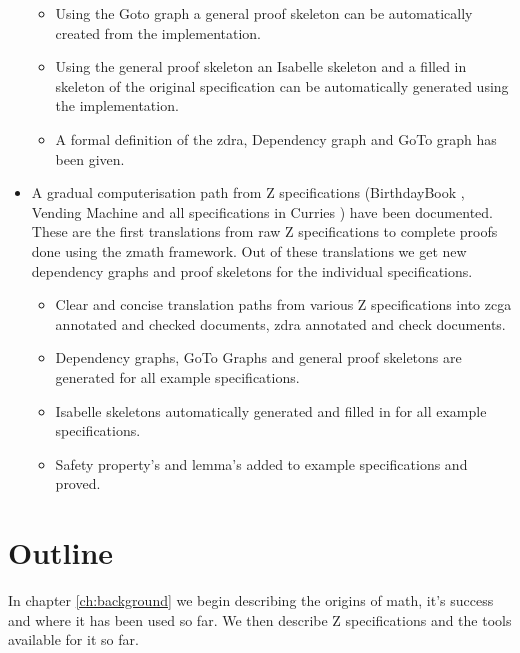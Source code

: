 \begin{itemize}
\begin{itemize}

\item Using the Goto graph a general proof skeleton can be automatically created from the implementation.

\item Using the general proof skeleton an Isabelle skeleton and a filled in skeleton of the original specification can be automatically generated using the implementation.

\item A formal definition of the \gls{zdra}, Dependency graph and GoTo graph has been given.
\end{itemize}

\item A gradual computerisation path from Z specifications (BirthdayBook \cite{spiveyreferencemanual}, Vending Machine \cite{pp} and all specifications in Curries \cite{essenceofz}) have been documented. These are the first translations from raw Z specifications to complete proofs done using the \gls{zmath} framework. Out of these translations we get new dependency graphs and proof skeletons for the individual specifications.

\begin{itemize}
\item Clear and concise translation paths from various Z specifications into \gls{zcga} annotated and checked documents, \gls{zdra} annotated and check documents.

\item Dependency graphs, GoTo Graphs and general proof skeletons are generated for all example specifications.

\item Isabelle skeletons automatically generated and filled in for all example specifications.

\item Safety property's and lemma's added to example specifications and proved.
\end{itemize}

\end{itemize}

\section{Outline}

In chapter \ref{ch:background} we begin describing the origins of \gls{math}, it's success and where it has been used so far. We then describe Z specifications and the tools available for it so far.

